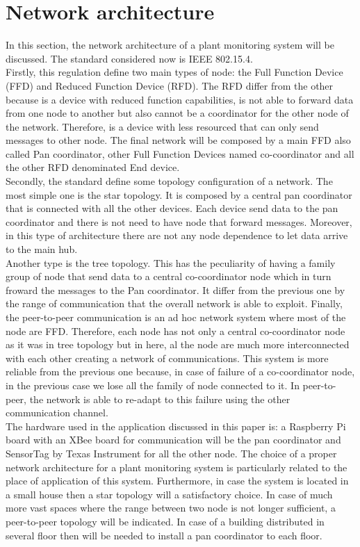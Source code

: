\section{Network architecture}
In this section, the network architecture of a plant monitoring system will be discussed. The standard considered now is IEEE 802.15.4.\\
 Firstly, this regulation define two main types of node: the Full Function Device (FFD) and Reduced Function Device (RFD). The RFD differ from the other because is a device with reduced function capabilities, is not able to forward data from one node to another but also cannot be a coordinator for the other node of the network. Therefore, is a device with less resourced that can only send messages to other node. The final network will be composed by a main FFD also called Pan coordinator, other Full Function Devices named co-coordinator and all the other RFD denominated End device. \\
 Secondly, the standard define some topology configuration of a network. The most simple one is the star topology. It is composed by a central pan coordinator that is connected with all the other devices. Each device send data to the pan coordinator and there is not need to have node that forward messages. Moreover, in this type of architecture there are not any node dependence to let data arrive to the main hub.\\
 Another type is the tree topology. This has the peculiarity of having a family group of node that send data to a central co-coordinator node which in turn froward the messages to the Pan coordinator. It differ from the previous one by the range of communication that the overall network is able to exploit.
 Finally, the peer-to-peer communication is an ad hoc network system where most of the node are FFD. Therefore, each node has not only a central co-coordinator node as it was in tree topology but in here, al the node are much more interconnected with each other creating a network of communications. This system is more reliable from the previous one because, in case of failure of a co-coordinator node, in the previous case we lose all the family of node connected to it. In peer-to-peer, the network is able to re-adapt to this failure using the other communication channel.\\
 The hardware used in the application discussed in this paper is: a Raspberry Pi board with an XBee board for communication will be the pan coordinator and SensorTag by Texas Instrument for all the other node. The choice of a proper network architecture for a plant monitoring system is particularly related to the place of application of this system. Furthermore, in case the system is located in a small house then a star topology will a satisfactory choice. In case of much more vast spaces where the range between two node is not longer sufficient, a peer-to-peer topology will be indicated. In case of a building distributed in several floor then will be needed to install a pan coordinator to each floor.\\
